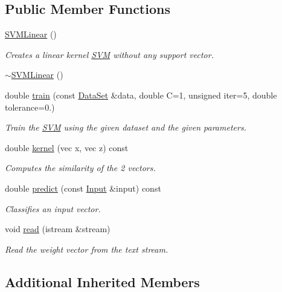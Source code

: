 \subsection*{Public Member Functions}
\begin{DoxyCompactItemize}
\item 
\hyperlink{classhappyml_1_1SVMLinear_a02451aa99f38b386702d68014a6b924f}{S\+V\+M\+Linear} ()
\begin{DoxyCompactList}\small\item\em Creates a linear kernel \hyperlink{classhappyml_1_1SVM}{S\+VM} without any support vector. \end{DoxyCompactList}\item 
\hyperlink{classhappyml_1_1SVMLinear_a8f204fd440955dca167c113df0dbaf73}{$\sim$\+S\+V\+M\+Linear} ()
\item 
double \hyperlink{classhappyml_1_1SVMLinear_a318e94752a99c25c000e9e176b8fa47e}{train} (const \hyperlink{classhappyml_1_1DataSet}{Data\+Set} \&data, double C=1, unsigned iter=5, double tolerance=0.)
\begin{DoxyCompactList}\small\item\em Train the \hyperlink{classhappyml_1_1SVM}{S\+VM} using the given dataset and the given parameters. \end{DoxyCompactList}\item 
double \hyperlink{classhappyml_1_1SVMLinear_ac7cb3d8280247f252b28d05d2fd10961}{kernel} (vec x, vec z) const 
\begin{DoxyCompactList}\small\item\em Computes the similarity of the 2 vectors. \end{DoxyCompactList}\item 
double \hyperlink{classhappyml_1_1SVMLinear_a7bf1f8e60104e34e0589b0b6cab1f447}{predict} (const \hyperlink{namespacehappyml_a03602d1ec49393790b8a0449f40cd01f}{Input} \&input) const 
\begin{DoxyCompactList}\small\item\em Classifies an input vector. \end{DoxyCompactList}\item 
void \hyperlink{classhappyml_1_1SVMLinear_a4259c29ba1acd320703bf8c1ae8fd780}{read} (istream \&stream)
\begin{DoxyCompactList}\small\item\em Read the weight vector from the text stream. \end{DoxyCompactList}\end{DoxyCompactItemize}
\subsection*{Additional Inherited Members}


